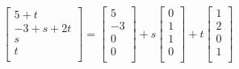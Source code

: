 \begin{Answer}
\begin{equation*}
\begin{bmatrix}
5+t\\
-3+s+2t\\
s\\
t\\    
\end{bmatrix}
=
\begin{bmatrix}
5\\
-3\\
0\\
0\\
\end{bmatrix}
+s
\begin{bmatrix}
0\\
1\\
1\\
0\\
\end{bmatrix}
+t
\begin{bmatrix}
1\\
2\\
0\\
1\\
\end{bmatrix}
\end{equation*}
\end{Answer}

